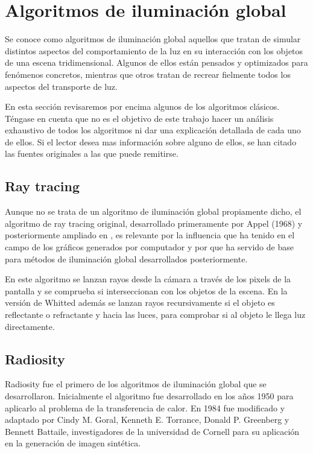 \clearpage

\section{Algoritmos de iluminación global}

Se conoce como algoritmos de iluminación global aquellos que tratan de simular distintos aspectos del comportamiento de la luz en su interacción con los objetos de una escena tridimensional. Algunos de ellos están pensados y optimizados para fenómenos concretos, mientras que otros tratan de recrear fielmente todos los aspectos del transporte de luz.

\medskip
En esta sección revisaremos por encima algunos de los algoritmos clásicos. Téngase en cuenta que no es el objetivo de este trabajo hacer un análisis exhaustivo de todos los algoritmos ni dar una explicación detallada de cada uno de ellos. Si el lector desea mas información sobre alguno de ellos, se han citado las fuentes originales a las que puede remitirse.

\subsection{Ray tracing}

Aunque no se trata de un algoritmo de iluminación global propiamente dicho, el algoritmo de ray tracing original, desarrollado primeramente por Appel (1968)\nocite{Appel1968} y posteriormente ampliado en \cite{Whitted1979}, es relevante por la influencia que ha tenido en el campo de los gráficos generados por computador y por que ha servido de base para métodos de iluminación global desarrollados posteriormente. 

\medskip

En este algoritmo se lanzan rayos desde la cámara a través de los pixels de la pantalla y se comprueba si interseccionan con los objetos de la escena. En la versión de Whitted además se lanzan rayos recursivamente si el objeto es reflectante o refractante y hacia las luces, para comprobar si al objeto le llega luz directamente.

 
\subsection{Radiosity}

Radiosity fue el primero de los algoritmos de iluminación global que se desarrollaron. Inicialmente el algoritmo fue desarrollado en los años 1950 para aplicarlo al problema de la transferencia de calor. En 1984 fue modificado y adaptado por \nocite{Goral1984} Cindy M. Goral, Kenneth E. Torrance, Donald P. Greenberg y Bennett Battaile, investigadores de la universidad de Cornell para su aplicación en la generación de imagen sintética.

